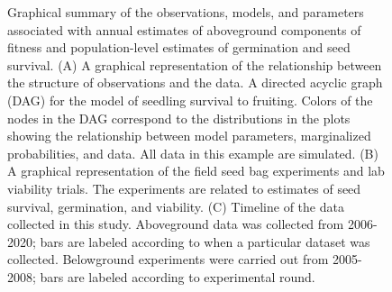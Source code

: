 \documentclass[12pt, oneside, titlepage]{article}   	%
\begin{document}
\begin{figure}[!h]
 \caption{ Graphical summary of the observations, models, and parameters associated with annual estimates of aboveground components of fitness and population-level estimates of germination and seed survival. (A) A graphical representation of the relationship between the structure of observations and the data. A directed acyclic graph (DAG) for the model of seedling survival to fruiting. Colors of the nodes in the DAG correspond to the distributions in the plots showing the relationship between model parameters, marginalized probabilities, and data. All data in this example are simulated. (B) A graphical representation of the field seed bag experiments and lab viability trials. The experiments are related to estimates of seed survival, germination, and viability. (C) Timeline of the data collected in this study. Aboveground data was collected from 2006-2020; bars are labeled according to when a particular dataset was collected. Belowground experiments were carried out from 2005-2008; bars are labeled according to experimental round. }
   \label{fig:diagram}
 \end{figure}
\end{document}

